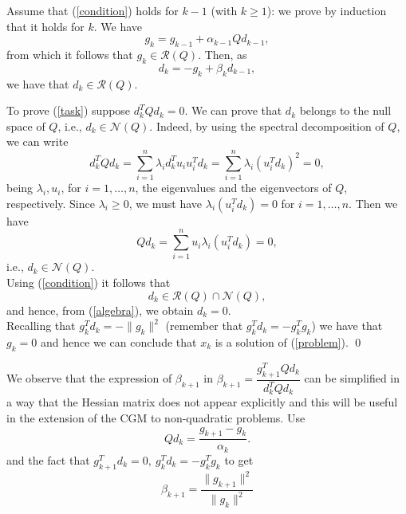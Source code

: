 \documentclass{ExerciseSheet}
\begin{document}
\begin{solution}
Assume that (\ref{condition}) holds for $k - 1$ (with $k \geq 1$): we prove by induction that it holds for $k$. We have
\[
g_k = g_{k-1} + \alpha_{k-1} Q d_{k-1},
\]
from which it follows that $g_k \in \mathcal{R}(Q)$. Then, as
\[
d_k = -g_k + \beta_k d_{k-1},
\]
we have that $d_k \in \mathcal{R}(Q)$.

To prove (\ref{task}) suppose $d_k^T Q d_k = 0$. We can prove that $d_k$ belongs to the null space of $Q$, i.e., $d_k \in \mathcal{N}(Q)$. Indeed, by using the spectral decomposition of $Q$, we can write
\[
d_k^T Q d_k = \sum_{i=1}^n \lambda_i d_k^T u_i u_i^T d_k = \sum_{i=1}^n \lambda_i (u_i^T d_k)^2 = 0,
\]
being $\lambda_i, u_i$, for $i = 1, \ldots, n$, the eigenvalues and the eigenvectors of $Q$, respectively. Since $\lambda_i \geq 0$, we must have $\lambda_i (u_i^T d_k) = 0$ for $i = 1, \ldots, n$. Then we have
\[
Q d_k = \sum_{i=1}^n u_i \lambda_i (u_i^T d_k) = 0,
\]
i.e., $d_k \in \mathcal{N}(Q)$. \\
Using (\ref{condition}) it follows that
\[
d_k \in \mathcal{R}(Q) \cap \mathcal{N}(Q),
\]
and hence, from (\ref{algebra}), we obtain $d_k = 0$. \\
Recalling that $g_k^T d_k = -\|g_k\|^2$ (remember that $g^T_kd_k = -g^T_kg_k$) we have that $g_k = 0$ and hence we can conclude that $x_k$ is a solution of (\ref{problem}). \qed


\end{solution}

\fi

\vskip 0.5cm

\begin{problem} 
We observe that the expression of $\beta_{k+1}$ in $ \beta_{k+1}  = \dfrac{g^T_{k+1}Qd_k}{d^T_kQd_k}$ can be simplified in a way that the Hessian matrix does not appear explicitly and this will be useful in the extension of the CGM to non-quadratic problems.
Use
\begin{equation}
    Q d_k = \frac{g_{k+1} - g_k}{\alpha_k}.
\end{equation} and the fact that $g^T_{k+1}d_k = 0, \ g^T_k d_k = -g^T_kg_k$ to get \begin{equation}
    \beta_{k+1} = \dfrac{\|g_{k+1}\|^2}{\|g_k\|^2}
\end{equation}
\end{problem}
\end{document}
